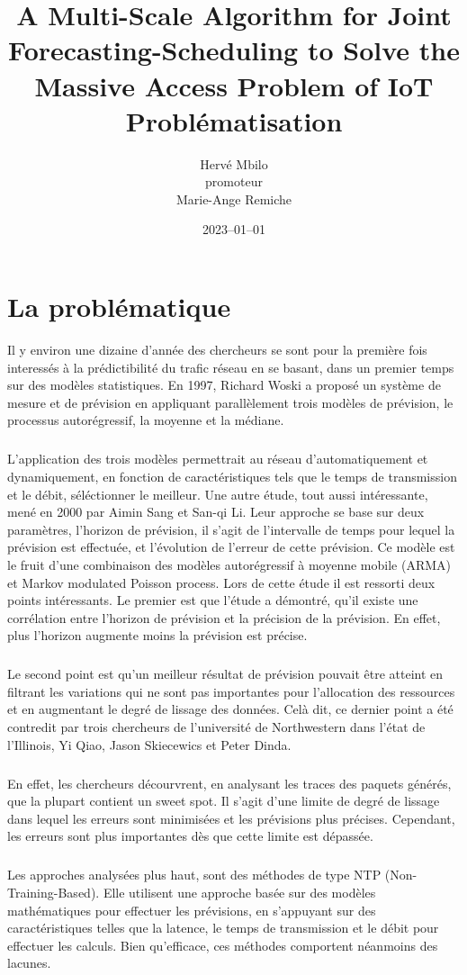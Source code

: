 \documentclass[12pt]{article}
\title{%
A Multi-Scale Algorithm for Joint
Forecasting-Scheduling to Solve the Massive
Access Problem of IoT
\bigskip \\
\large Problématisation}
\author{Hervé Mbilo \smallskip \\ promoteur \vspace{0.0em} \\ Marie-Ange Remiche}
\date{2023–01–01}
\begin{document}
\maketitle

\section{La problématique}

Il y environ une dizaine d'année des chercheurs se sont pour la première fois interessés à la prédictibilité du trafic réseau en se basant, dans un premier temps sur des modèles statistiques.
En 1997, Richard Woski a proposé un système de mesure et de prévision en appliquant parallèlement trois modèles de prévision, le processus autorégressif, la moyenne et la médiane.
\subparagraph{}L'application des trois modèles permettrait au réseau d'automatiquement et dynamiquement, en fonction de caractéristiques tels que le temps de transmission et le débit, séléctionner le meilleur.
Une autre étude, tout aussi intéressante, mené en 2000 par Aimin Sang et San-qi Li. 
Leur approche se base sur deux paramètres, l'horizon de prévision, il s'agit de l'intervalle de temps pour lequel la prévision est effectuée, et l'évolution de l'erreur de cette prévision.
Ce modèle est le fruit d'une combinaison des modèles autorégressif à moyenne mobile (ARMA) et Markov modulated Poisson process.
Lors de cette étude il est ressorti deux points intéressants. Le premier est que l'étude a démontré, qu'il existe une corrélation entre l'horizon de prévision et la précision de la prévision.
En effet, plus l'horizon augmente moins la prévision est précise. 
\subparagraph{} Le second point est qu'un meilleur résultat de prévision pouvait être atteint en filtrant les variations qui ne sont pas importantes pour l'allocation des ressources et en augmentant le degré de lissage des données.
Celà dit, ce dernier point a été contredit par trois chercheurs de l'université de Northwestern dans l'état de l'Illinois, Yi Qiao, Jason Skiecewics et Peter Dinda.
\subparagraph{}En effet, les chercheurs décourvrent, en analysant les traces des paquets générés, que la plupart contient un sweet spot. Il s'agit d'une limite de degré de lissage dans lequel les erreurs sont minimisées et les prévisions plus précises. Cependant, les erreurs sont plus importantes dès que cette limite est dépassée.
\subparagraph{}Les approches analysées plus haut, sont des méthodes de type NTP (Non-Training-Based). Elle utilisent une approche basée sur des modèles mathématiques pour effectuer les prévisions, en s'appuyant sur des caractéristiques telles que la latence, le temps de transmission et le débit pour effectuer les calculs. Bien qu'efficace, ces méthodes comportent néanmoins des lacunes.
\end{document}
